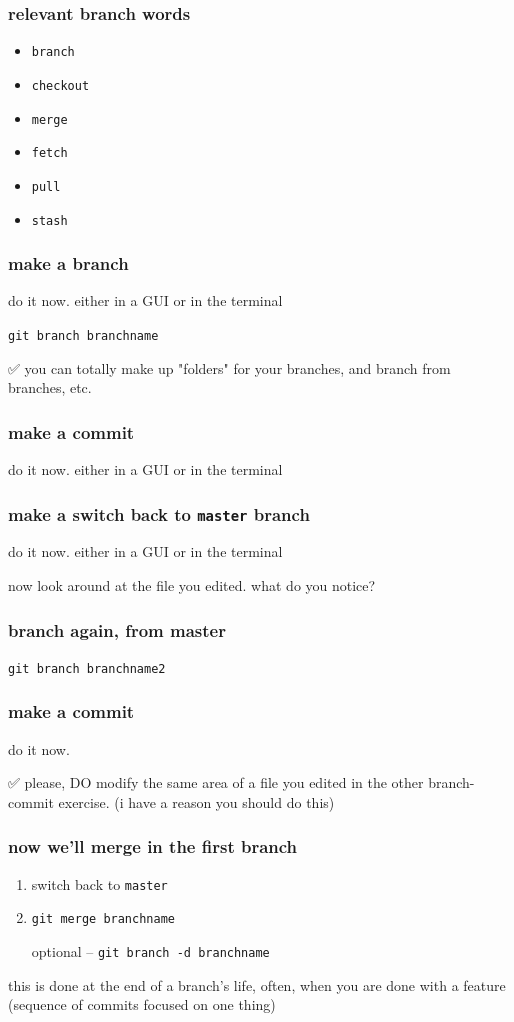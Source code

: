 \documentclass[14pt,aspectratio=1610]{beamer} %
\newcommand{\fframe}[2]{
   \begin{frame}
\frametitle{#1}
#2
\end{frame}
}
\begin{document}
\fframe{relevant branch words}
{
	 \begin{itemize}
		\item {\tt branch}
		\item {\tt checkout}
		\item {\tt merge}
		\item {\tt fetch}
		\item {\tt pull}
		\item {\tt stash}
	\end{itemize}
}


\fframe{make a branch}
{do it now.  either in a GUI or in the terminal

\vspace{\baselineskip}

{\tt git branch branchname}

\vspace{\baselineskip}

✅ you can totally make up "folders" for your branches, and branch from branches, etc.
}



\fframe{make a commit}
{do it now.  either in a GUI or in the terminal}

\fframe{make a switch back to {\tt master} branch}
{do it now.  either in a GUI or in the terminal


\vspace{\baselineskip}

now look around at the file you edited.  what do you notice?
}

\fframe{branch again, from master}
{
	{\tt git branch branchname2}
}


\fframe{make a commit}
{
do it now.  


\vspace{\baselineskip}

✅ 
please, DO modify the same area of a file you edited in the other branch-commit exercise.  (i have a reason you should do this)

}


\fframe{now we'll merge in the first branch}
{
	\begin{enumerate}
		\item switch back to {\tt master}
		\item {\tt git merge  branchname}
		\item [optional] -- {\tt git branch -d branchname}
	\end{enumerate}

\vspace{\baselineskip}

	this is done at the end of a branch's life, often, when you are done with a feature (sequence of commits focused on one thing)
}
\end{document}
